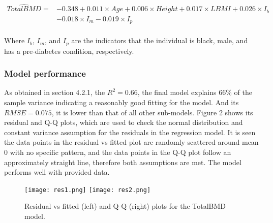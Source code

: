 \documentclass[11pt]{article}
\begin{document}
\begin{equation}
\begin{split}
\hat{TotalBMD} = &-0.348 +0.011\times Age +0.006\times Height +0.017\times LBMI + 0.026\times I_b\\&-0.018\times I_m -0.019\times I_p\\
\end{split}
\end{equation}

Where $I_b$, $I_m$, and $I_p$ are the indicators that the individual is black, male, and has a pre-diabetes condition, respectively.

\subsubsection {Model performance}
As obtained in section 4.2.1, the $R^2=0.66$, the final model explains 66\% of the sample variance indicating a reasonably good fitting for the model. And its $RMSE =0.075$, it is lower than that of all other sub-models. Figure 2 shows its residual and Q-Q plots, which are used to check the normal distribution and constant variance assumption for the residuals in the regression model. It is seen the data points in the residual vs fitted plot are randomly scattered around mean 0 with no specific pattern, and the data points in the Q-Q plot follow an approximately straight line, therefore both assumptions are met. The model performs well with provided data.

\begin{figure}[!htbp]
\centering \texttt{[image: res1.png]}
\texttt{[image: res2.png]}
\caption{Residual vs fitted (left) and Q-Q (right) plots for the TotalBMD model.}
\label{fig:method}
\end{figure}
            
\end{document}
